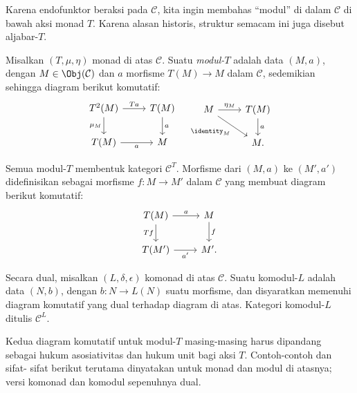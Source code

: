Karena endofunktor beraksi pada $\mathcal{C}$, kita ingin membahas ``modul''
di dalam $\mathcal{C}$ di bawah aksi monad $T$. Karena alasan historis,
struktur semacam ini juga disebut aljabar-$T$.

\begin{definition}\label{def:T-Alg}
	Misalkan $(T,\mu,\eta)$ monad di atas $\mathcal{C}$. Suatu \emph{modul-$T$}
	adalah data $(M,a)$, dengan $M\in\Obj(\mathcal{C})$ dan $a$ morfisme
	$T(M)\to M$ dalam $\mathcal{C}$, sedemikian sehingga diagram berikut
	komutatif:
	\[\begin{tikzcd}
		T^2 (M) \arrow[r, "Ta"] \arrow[d, "\mu_M"'] & T(M) \arrow[d, "a"] \\
		T(M) \arrow[r, "a"'] & M
	\end{tikzcd} \quad \begin{tikzcd}
		M \arrow[r, "\eta_M"] \arrow[rd, "{\identity_M}"'] & T(M) \arrow[d, "a"] \\
		& M .
	\end{tikzcd}\]

	Semua modul-$T$ membentuk kategori $\mathcal{C}^T$. Morfisme dari $(M,a)$
	ke $(M',a')$ didefinisikan sebagai morfisme $f:M\to M'$ dalam
	$\mathcal{C}$ yang membuat diagram berikut komutatif:
	\[\begin{tikzcd}
		T(M) \arrow[r, "a"] \arrow[d, "Tf"'] & M \arrow[d, "f"] \\
		T(M')  \arrow[r, "{a'}"'] & M' .
	\end{tikzcd}\]

	Secara dual, misalkan $(L,\delta,\epsilon)$ komonad di atas $\mathcal{C}$.
	Suatu komodul-$L$ adalah data $(N,b)$, dengan
	$b:N\to L(N)$ suatu morfisme, dan disyaratkan memenuhi diagram komutatif
	yang dual terhadap diagram di atas. Kategori komodul-$L$ ditulis
	$\mathcal{C}^L$.
\end{definition}

Kedua diagram komutatif untuk modul-$T$ masing-masing harus dipandang sebagai
hukum asosiativitas dan hukum unit bagi aksi $T$. Contoh-contoh dan sifat-
sifat berikut terutama dinyatakan untuk monad dan modul di atasnya; versi
komonad dan komodul sepenuhnya dual.

